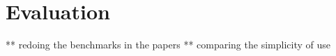 
\chapter{Evaluation} %

\label{Chapter4} %


** redoing the benchmarks in the papers
** comparing the simplicity of use
